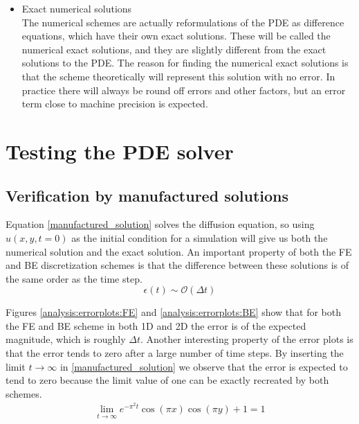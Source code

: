 \begin{itemize}
  \item Exact numerical solutions \\
  The numerical schemes are actually reformulations of the PDE as difference equations, which have their own exact solutions. 
  These will be called the numerical exact solutions, and they are slightly different from the exact solutions to the PDE. 
  The reason for finding the numerical exact solutions is that the scheme theoretically will represent this solution with no error. 
  In practice there will always be round off errors and other factors, but an error term close to machine precision is expected.
\end{itemize}

\section{Testing the PDE solver}


\subsection{Verification by manufactured solutions}

Equation \eqref{manufactured_solution} solves the diffusion equation, so using $u(x,y,t=0)$ as the initial condition for a simulation will give us both the numerical solution and the exact solution. 
An important property of both the FE and BE discretization schemes is that the difference between these solutions is of the same order as the time step.
\begin{equation*}
 \epsilon(t) \sim \mathcal{O}(\Delta t)
\end{equation*}

Figures \ref{analysis:errorplots:FE} and \ref{analysis:errorplots:BE} show that for both the FE and BE scheme in both 1D and 2D the error is of the expected magnitude, which is roughly $\Delta t$. 
Another interesting property of the error plots is that the error tends to zero after a large number of time steps. 
By inserting the limit $t\to\infty$ in \eqref{manufactured_solution} we observe that the error is expected to tend to zero because the limit value of one can be exactly recreated by both schemes.
\begin{align*}
 \lim_{t\to\infty} e^{-\pi^2t}\cos(\pi x)\cos(\pi y) +1 = 1
\end{align*}

